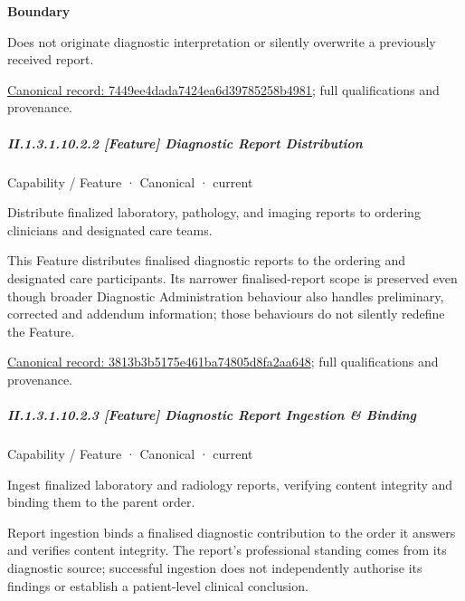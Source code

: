 \textbf{Boundary}



Does not originate diagnostic interpretation or silently overwrite a previously received report.


{\footnotesize \href{../../../../../../../continuum/strategy/capability/feature/7449ee4dada7424ea6d39785258b4981.md}{Canonical record: 7449ee4dada7424ea6d39785258b4981}; full qualifications and provenance.}\par
\subparagraph*{II.1.3.1.10.2.2 [Feature] Diagnostic Report Distribution}
\label{navigation:II.1.3.1.10.2.2}

\label{element:3813b3b5175e461ba74805d8fa2aa648}
{\small Capability / Feature · Canonical · current}\par

Distribute finalized laboratory, pathology, and imaging reports to ordering clinicians and designated care teams.



This Feature distributes finalised diagnostic reports to the ordering and designated care participants. Its narrower finalised-report scope is preserved even though broader Diagnostic Administration behaviour also handles preliminary, corrected and addendum information; those behaviours do not silently redefine the Feature.


{\footnotesize \href{../../../../../../../continuum/strategy/capability/feature/3813b3b5175e461ba74805d8fa2aa648.md}{Canonical record: 3813b3b5175e461ba74805d8fa2aa648}; full qualifications and provenance.}\par
\subparagraph*{II.1.3.1.10.2.3 [Feature] Diagnostic Report Ingestion \& Binding}
\label{navigation:II.1.3.1.10.2.3}

\label{element:a00823445a8a44c1a00f3ec93a7e0e6f}
{\small Capability / Feature · Canonical · current}\par

Ingest finalized laboratory and radiology reports, verifying content integrity and binding them to the parent order.



Report ingestion binds a finalised diagnostic contribution to the order it answers and verifies content integrity. The report's professional standing comes from its diagnostic source; successful ingestion does not independently authorise its findings or establish a patient-level clinical conclusion.


